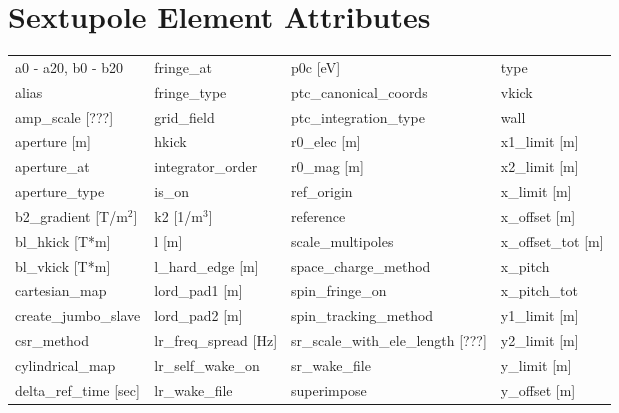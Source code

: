  \section{Sextupole Element Attributes}
 \label{s:list.sextupole}
 
 \begin{tabular}{llll} \toprule
a0 - a20, b0 - b20             & fringe_at                      & p0c [eV]                       & type                           \\
alias                          & fringe_type                    & ptc_canonical_coords           & vkick                          \\
amp_scale [???]                & grid_field                     & ptc_integration_type           & wall                           \\
aperture [m]                   & hkick                          & r0_elec [m]                    & x1_limit [m]                   \\
aperture_at                    & integrator_order               & r0_mag [m]                     & x2_limit [m]                   \\
aperture_type                  & is_on                          & ref_origin                     & x_limit [m]                    \\
b2_gradient [T/m$^2$]          & k2 [1/m$^3$]                   & reference                      & x_offset [m]                   \\
bl_hkick [T*m]                 & l [m]                          & scale_multipoles               & x_offset_tot [m]               \\
bl_vkick [T*m]                 & l_hard_edge [m]                & space_charge_method            & x_pitch                        \\
cartesian_map                  & lord_pad1 [m]                  & spin_fringe_on                 & x_pitch_tot                    \\
create_jumbo_slave             & lord_pad2 [m]                  & spin_tracking_method           & y1_limit [m]                   \\
csr_method                     & lr_freq_spread [Hz]            & sr_scale_with_ele_length [???] & y2_limit [m]                   \\
cylindrical_map                & lr_self_wake_on                & sr_wake_file                   & y_limit [m]                    \\
delta_ref_time [sec]           & lr_wake_file                   & superimpose                    & y_offset [m]                   \\

\end{tabular}
